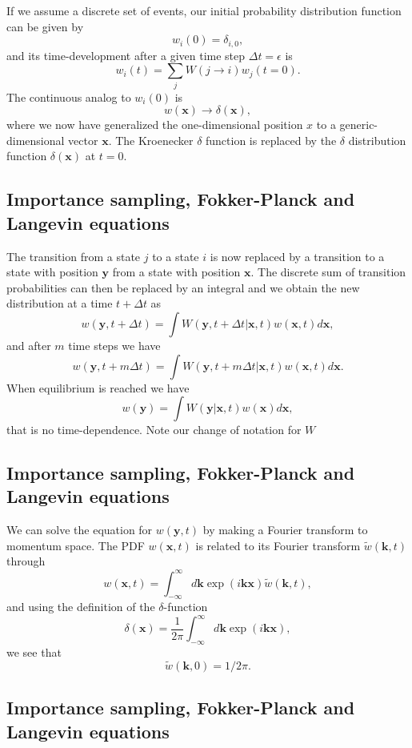 \documentclass[%
oneside,                 %
final,                   %
10pt]{article}
\begin{document}
If we assume a discrete set of events,
our initial probability
distribution function can be  given by 
\[
   w_i(0) = \delta_{i,0},
\]
and its time-development after a given time step $\Delta t=\epsilon$ is
\[ 
   w_i(t) = \sum_{j}W(j\rightarrow i)w_j(t=0).
\] 
The continuous analog to $w_i(0)$ is
\[
   w(\mathbf{x})\rightarrow \delta(\mathbf{x}),
\]
where we now have generalized the one-dimensional position $x$ to a generic-dimensional  
vector $\mathbf{x}$. The Kroenecker $\delta$ function is replaced by the $\delta$ distribution
function $\delta(\mathbf{x})$ at  $t=0$.  

\subsection{Importance sampling, Fokker-Planck and Langevin equations}

The transition from a state $j$ to a state $i$ is now replaced by a transition
to a state with position $\mathbf{y}$ from a state with position $\mathbf{x}$. 
The discrete sum of transition probabilities can then be replaced by an integral
and we obtain the new distribution at a time $t+\Delta t$ as 
\[
   w(\mathbf{y},t+\Delta t)= \int W(\mathbf{y},t+\Delta t| \mathbf{x},t)w(\mathbf{x},t)d\mathbf{x},
\]
and after $m$ time steps we have
\[
   w(\mathbf{y},t+m\Delta t)= \int W(\mathbf{y},t+m\Delta t| \mathbf{x},t)w(\mathbf{x},t)d\mathbf{x}.
\]
When equilibrium is reached we have
\[
   w(\mathbf{y})= \int W(\mathbf{y}|\mathbf{x}, t)w(\mathbf{x})d\mathbf{x},
\]
that is no time-dependence. Note our change of notation for $W$

\subsection{Importance sampling, Fokker-Planck and Langevin equations}

We can solve the equation for $w(\mathbf{y},t)$ by making a Fourier transform to
momentum space. 
The PDF $w(\mathbf{x},t)$ is related to its Fourier transform
$\tilde{w}(\mathbf{k},t)$ through
\[
   w(\mathbf{x},t) = \int_{-\infty}^{\infty}d\mathbf{k} \exp{(i\mathbf{kx})}\tilde{w}(\mathbf{k},t),
\]
and using the definition of the 
$\delta$-function 
\[
   \delta(\mathbf{x}) = \frac{1}{2\pi} \int_{-\infty}^{\infty}d\mathbf{k} \exp{(i\mathbf{kx})},
\]
 we see that
\[
   \tilde{w}(\mathbf{k},0)=1/2\pi.
\]

\subsection{Importance sampling, Fokker-Planck and Langevin equations}
\end{document}
